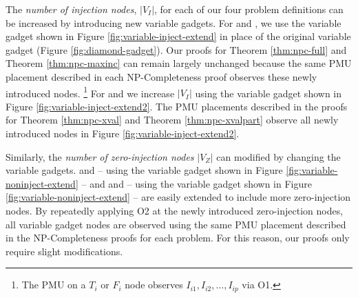
The {\em number of injection nodes}, $|V_I|$, for each of our four problem definitions can be increased by introducing new variable gadgets.
For \full and \maxincs, we use the variable gadget shown in Figure \ref{fig:variable-inject-extend} in place of the original
variable gadget (Figure \ref{fig:diamond-gadget}). Our proofs for Theorem \ref{thm:npc-full} and Theorem \ref{thm:npc-maxinc} can remain largely unchanged because
the same PMU placement described in each NP-Completeness proof observes these newly introduced nodes.
{\footnote {\small The PMU on a $T_i$ or $F_i$ node observes $I_{i1}, I_{i2}, \dots ,I_{ip}$ via O1. }}
For \xval and \xvalpart we increase $|V_I|$ using the variable gadget shown in Figure \ref{fig:variable-inject-extend2}.  The PMU placements described in the proofs
for Theorem \ref{thm:npc-xval} and Theorem \ref{thm:npc-xvalpart} observe all newly introduced nodes in Figure \ref{fig:variable-inject-extend2}.

Similarly, the {\em number of zero-injection nodes} $|V_Z|$ can modified by changing the variable gadgets. \full and \maxinc -- using the variable gadget shown in Figure \ref{fig:variable-noninject-extend} -- and
\xval and \xvalpart -- using the variable gadget shown in Figure \ref{fig:variable-noninject-extend} -- are easily extended to include more zero-injection nodes.  By repeatedly applying O2 at the
newly introduced zero-injection nodes, all variable gadget nodes are observed using the same PMU placement described in the NP-Completeness proofs for each problem.  For this reason, our
proofs only require slight modifications.

